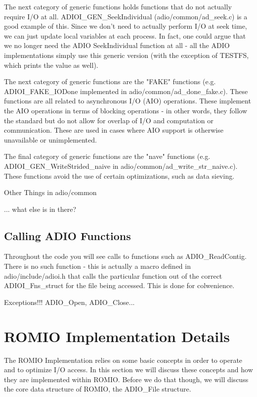 The next category of generic functions holds functions that do not actually
require I/O at all.  ADIOI\_GEN\_SeekIndividual (adio/common/ad\_seek.c) is a
good example of this.  Since we don't need to actually perform I/O at seek
time, we can just update local variables at each process.  In fact, one could
argue that we no longer need the ADIO SeekIndividual function at all - all the
ADIO implementations simply use this generic version (with the exception of
TESTFS, which prints the value as well).

The next category of generic functions are the "FAKE" functions (e.g.
ADIOI\_FAKE\_IODone implemented in adio/common/ad\_done\_fake.c).  These functions
are all related to asynchronous I/O (AIO) operations.  These implement the AIO
operations in terms of blocking operations - in other words, they follow the
standard but do not allow for overlap of I/O and computation or communication.
These are used in cases where AIO support is otherwise unavailable or
unimplemented.

The final category of generic functions are the "nave" functions (e.g.
ADIOI\_GEN\_WriteStrided\_naive in adio/common/ad\_write\_str\_naive.c).  These
functions avoid the use of certain optimizations, such as data sieving.

Other Things in adio/common

... what else is in there?

\subsection{Calling ADIO Functions}

Throughout the code you will see calls to functions such as ADIO\_ReadContig.
There is no such function - this is actually a macro defined in
adio/include/adioi.h that calls the particular function out of the correct
ADIOI\_Fns\_struct for the file being accessed.  This is done for colwenience.

Exceptions!!!  ADIO\_Open, ADIO\_Close...

\section{ROMIO Implementation Details}

The ROMIO Implementation relies on some basic concepts in order to operate and
to optimize I/O access.  In this section we will discuss these concepts and
how they are implemented within ROMIO.  Before we do that though, we will
discuss the core data structure of ROMIO, the ADIO\_File structure.

